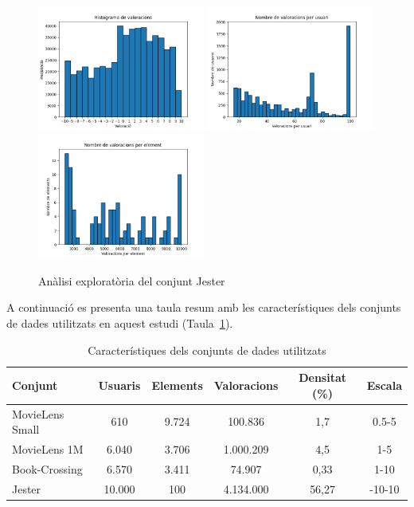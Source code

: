 \documentclass[a4paper,12pt]{report}
\begin{document}
\begin{figure}[H]
    \centering
    \includegraphics[width=0.49\textwidth]{Figuras/jester-ratings.png}
    \hfill
    \includegraphics[width=0.49\textwidth]{Figuras/jester-users.png}
    \hfill
    \includegraphics[width=0.49\textwidth]{Figuras/jester-items.png}
    \caption{Anàlisi exploratòria del conjunt Jester}
    \label{fig:analisis_jester}
\end{figure}

A continuació es presenta una taula resum amb les característiques dels conjunts de dades utilitzats en aquest estudi (Taula~\ref{tab:datasets}).

\begin{table}[H]
    \centering
    \begin{tabular}{|l|c|c|c|c|c|}
    \hline
    \textbf{Conjunt} & \textbf{Usuaris} & \textbf{Elements} & \textbf{Valoracions} & \textbf{Densitat (\%)} & \textbf{Escala} \\ \hline
    MovieLens Small & 610   & 9.724 & 100.836 & 1,7 & 0.5-5  \\ \hline
    MovieLens 1M         & 6.040 & 3.706 & 1.000.209 & 4,5 & 1-5   \\ \hline
    Book-Crossing        & 6.570 & 3.411 & 74.907   & 0,33 & 1-10 \\ \hline
    Jester               & 10.000& 100   & 4.134.000& 56,27 & -10-10 \\ \hline
    \end{tabular}
    \caption{Característiques dels conjunts de dades utilitzats}
    \label{tab:datasets}
\end{table}

\printbibliography[heading=bibintoc]
\end{document}
